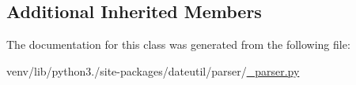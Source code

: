 \subsection*{Additional Inherited Members}


The documentation for this class was generated from the following file\+:\begin{DoxyCompactItemize}
\item 
venv/lib/python3./site-\/packages/dateutil/parser/\hyperlink{dateutil_2parser_2__parser_8py}{\+\_\+parser.\+py}\end{DoxyCompactItemize}
